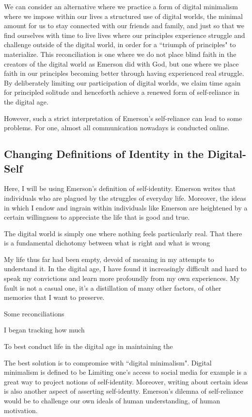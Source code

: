 \documentclass[12pt,letterpaper]{article}
\newif\ifdraft
\begin{document}
We can consider an alternative where we practice a form of digital minimalism where we impose within our lives a structured use of digital worlds, the minimal amount for us to stay connected with our friends and family, and just so that we find ourselves with time to live lives where our principles experience struggle and challenge outside of the digital world, in order for a ``triumph of principles" to materialize.  This reconciliation is one where we do not place blind faith in the creators of the digital world as Emerson did with God, but one where we place faith in our principles becoming better through having experienced real struggle.  By deliberately limiting our participation of digital worlds, we claim time again for principled solitude and henceforth achieve a renewed form of self-reliance in the digital age.

\ifdraft
However, such a strict interpretation of Emerson's self-reliance can lead to some problems.  For one, almost all communication nowadays is conducted online.

\subsection{Changing Definitions of Identity in the Digital-Self}
Here, I will be using Emerson's definition of self-identity.  Emerson writes that individuals who are plagued by the struggles of everyday life.  Moreover, the ideas in which I endow and ingrain within individuals like Emerson are heightened by a certain willingness to appreciate the life that is good and true.

The digital world is simply one where nothing feels particularly real.  That there is a fundamental dichotomy between what is right and what is wrong


My life thus far had been empty, devoid of meaning in my attempts to understand it.  In the digital age, I have found it increasingly difficult and hard to speak my convictions and learn more profoundly from my own experiences.  My fault is not a casual one, it's a distillation of many other factors, of other memories that I want to preserve.

Some reconciliations

I began tracking how much 



To best conduct life in the digital age in maintaining the 

The best solution is to compromise with ``digital minimalism".  Digital minimalism is defined to be Limiting one's access to social media for example is a great way to project notions of self-identity.  Moreover, writing about certain ideas is also another aspect of asserting self-identty.  
 Emerson's dilemna of self-reliance would be to challenge our own ideals of human understanding, of human motivation.
\end{document}
